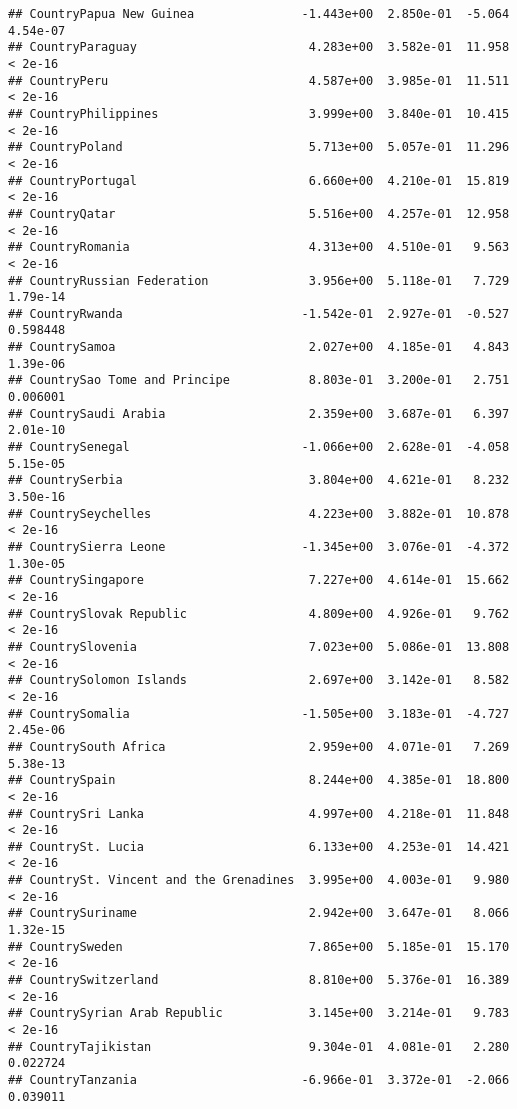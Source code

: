 \documentclass[
]{article}
\begin{document}
\begin{verbatim}
## CountryPapua New Guinea               -1.443e+00  2.850e-01  -5.064 4.54e-07
## CountryParaguay                        4.283e+00  3.582e-01  11.958  < 2e-16
## CountryPeru                            4.587e+00  3.985e-01  11.511  < 2e-16
## CountryPhilippines                     3.999e+00  3.840e-01  10.415  < 2e-16
## CountryPoland                          5.713e+00  5.057e-01  11.296  < 2e-16
## CountryPortugal                        6.660e+00  4.210e-01  15.819  < 2e-16
## CountryQatar                           5.516e+00  4.257e-01  12.958  < 2e-16
## CountryRomania                         4.313e+00  4.510e-01   9.563  < 2e-16
## CountryRussian Federation              3.956e+00  5.118e-01   7.729 1.79e-14
## CountryRwanda                         -1.542e-01  2.927e-01  -0.527 0.598448
## CountrySamoa                           2.027e+00  4.185e-01   4.843 1.39e-06
## CountrySao Tome and Principe           8.803e-01  3.200e-01   2.751 0.006001
## CountrySaudi Arabia                    2.359e+00  3.687e-01   6.397 2.01e-10
## CountrySenegal                        -1.066e+00  2.628e-01  -4.058 5.15e-05
## CountrySerbia                          3.804e+00  4.621e-01   8.232 3.50e-16
## CountrySeychelles                      4.223e+00  3.882e-01  10.878  < 2e-16
## CountrySierra Leone                   -1.345e+00  3.076e-01  -4.372 1.30e-05
## CountrySingapore                       7.227e+00  4.614e-01  15.662  < 2e-16
## CountrySlovak Republic                 4.809e+00  4.926e-01   9.762  < 2e-16
## CountrySlovenia                        7.023e+00  5.086e-01  13.808  < 2e-16
## CountrySolomon Islands                 2.697e+00  3.142e-01   8.582  < 2e-16
## CountrySomalia                        -1.505e+00  3.183e-01  -4.727 2.45e-06
## CountrySouth Africa                    2.959e+00  4.071e-01   7.269 5.38e-13
## CountrySpain                           8.244e+00  4.385e-01  18.800  < 2e-16
## CountrySri Lanka                       4.997e+00  4.218e-01  11.848  < 2e-16
## CountrySt. Lucia                       6.133e+00  4.253e-01  14.421  < 2e-16
## CountrySt. Vincent and the Grenadines  3.995e+00  4.003e-01   9.980  < 2e-16
## CountrySuriname                        2.942e+00  3.647e-01   8.066 1.32e-15
## CountrySweden                          7.865e+00  5.185e-01  15.170  < 2e-16
## CountrySwitzerland                     8.810e+00  5.376e-01  16.389  < 2e-16
## CountrySyrian Arab Republic            3.145e+00  3.214e-01   9.783  < 2e-16
## CountryTajikistan                      9.304e-01  4.081e-01   2.280 0.022724
## CountryTanzania                       -6.966e-01  3.372e-01  -2.066 0.039011

\end{verbatim}
\end{document}
